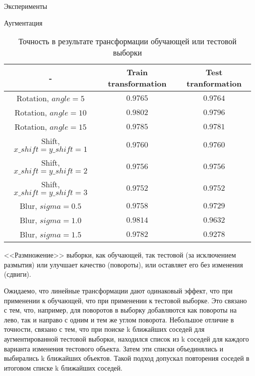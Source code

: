 \documentclass[a4paper,12pt,titlepage,finall]{article}
\begin{document}
\begin{section}{Эксперименты}
\begin{subsection}{Анализ работы K-NN}
\begin{figure}[H]
	\texttt{[image: \\detokenize\{./../experiment\_4/wrong\_classifies.png]}}
	\centering
	\caption{Неверно классифицированные объекты. Корректная метка (Предсказанная метка)}
	\label{pic:1}
\end{figure}


\end{subsection}
	
\begin{subsection}{Аугментация}
	
\begin{table}[H]
	\begin{tabular}{c||c|c}
		- & Train transformation & Test tranformation \\
		\hline
		Rotation, $angle=5$          & $0.9765$               & $0.9764$             \\
		Rotation, $angle=10$         & $0.9802$               & $\bm{0.9796}$             \\
		Rotation, $angle=15$         & $0.9785$               & $0.9781$             \\
		Shift, $x\_shift=y\_shift = 1$ & $0.9760$               & $0.9760$             \\
		Shift, $x\_shift=y\_shift = 2$ & $0.9756$               & $0.9756$             \\
		Shift, $x\_shift=y\_shift = 3$ & $0.9752$               & $0.9752$             \\
		Blur, $sigma=0.5$          & $0.9758$               & $0.9729$             \\
		Blur, $sigma=1.0$          & $\bm{0.9814}$               & $0.9632$             \\
		Blur, $sigma=1.5$          & $0.9782$               & $0.9278$            
	\end{tabular}
	\centering
	\label{tbl:5}
	\caption{Точность в результате трансформации обучающей или тестовой выборки}
\end{table}

<<Размножение>> выборки, как обучающей, так тестовой (за исключением размытия) или улучшает качество (повороты), или оставляет его без изменения (сдвиги). \par
Ожидаемо, что линейные трансформации дают одинаковый эффект, что при применении к обучающей, что при применении к тестовой выборке. Это связано с тем, что, например, для поворотов в выборку добавляются как повороты на лево, так и направо с одним и тем же углом поворота. Небольшое отличие в точности, связано с тем, что при поиске k ближайших соседей для аугментированной тестовой выборки, находился список из k соседей для каждого варианта изменения тестового объекта. Затем эти списки объединялись и выбирались k ближайших объектов. Такой подход допускал повторения соседей в итоговом списке k ближайших соседей.\par
	

\end{subsection}
\end{section}
\end{document}

